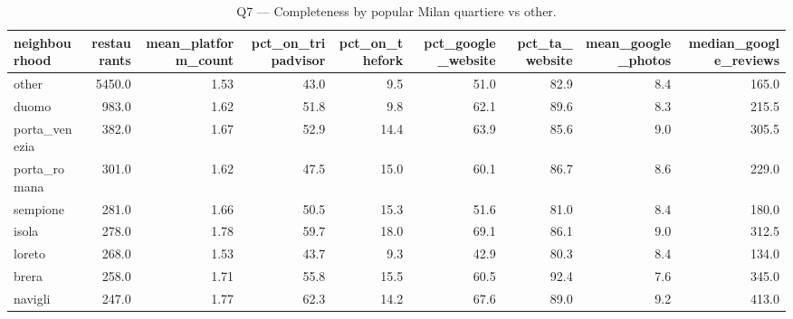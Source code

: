 \begin{table}[ht]
\centering
\caption{Q7 — Completeness by popular Milan quartiere vs other.}
\label{tab:q7_completeness_neighbourhood}
{\tiny
\begin{tabular}{lrrrrrrrr}
\toprule
neighbourhood & restaurants & mean\_platform\_count & pct\_on\_tripadvisor & pct\_on\_thefork & pct\_google\_website & pct\_ta\_website & mean\_google\_photos & median\_google\_reviews \\
\midrule
other & 5450.0 & 1.53 & 43.0 & 9.5 & 51.0 & 82.9 & 8.4 & 165.0 \\
duomo & 983.0 & 1.62 & 51.8 & 9.8 & 62.1 & 89.6 & 8.3 & 215.5 \\
porta\_venezia & 382.0 & 1.67 & 52.9 & 14.4 & 63.9 & 85.6 & 9.0 & 305.5 \\
porta\_romana & 301.0 & 1.62 & 47.5 & 15.0 & 60.1 & 86.7 & 8.6 & 229.0 \\
sempione & 281.0 & 1.66 & 50.5 & 15.3 & 51.6 & 81.0 & 8.4 & 180.0 \\
isola & 278.0 & 1.78 & 59.7 & 18.0 & 69.1 & 86.1 & 9.0 & 312.5 \\
loreto & 268.0 & 1.53 & 43.7 & 9.3 & 42.9 & 80.3 & 8.4 & 134.0 \\
brera & 258.0 & 1.71 & 55.8 & 15.5 & 60.5 & 92.4 & 7.6 & 345.0 \\
navigli & 247.0 & 1.77 & 62.3 & 14.2 & 67.6 & 89.0 & 9.2 & 413.0 \\
\bottomrule
\end{tabular}
}
\end{table}
